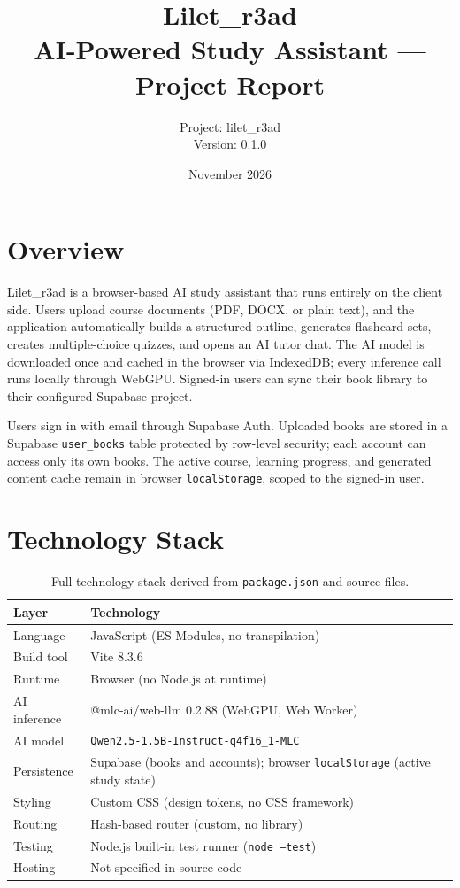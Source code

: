 \documentclass[12pt,a4paper]{article}
\title{\textbf{Lilet\_r3ad} \\ \large AI-Powered Study Assistant --- Project Report}
\author{Project: lilet\_r3ad \\ Version: 0.1.0}
\date{November 2026}
\begin{document}
\maketitle
\tableofcontents
\newpage

\section{Overview}

Lilet\_r3ad is a browser-based AI study assistant that runs entirely on the client
side. Users upload course documents (PDF, DOCX, or plain text), and the application
automatically builds a structured outline, generates flashcard sets, creates
multiple-choice quizzes, and opens an AI tutor chat. The AI model is downloaded
once and cached in the browser via IndexedDB; every inference call runs locally
through WebGPU. Signed-in users can sync their book library to their configured
Supabase project.

Users sign in with email through Supabase Auth. Uploaded books are stored in a
Supabase \texttt{user\_books} table protected by row-level security; each account
can access only its own books. The active course, learning progress, and generated
content cache remain in browser \texttt{localStorage}, scoped to the signed-in user.

\section{Technology Stack}

\begin{table}[h]
\centering
\begin{tabular}{@{}ll@{}}
\toprule
\textbf{Layer} & \textbf{Technology} \\
\midrule
Language          & JavaScript (ES Modules, no transpilation) \\
Build tool        & Vite 8.3.6 \\
Runtime           & Browser (no Node.js at runtime) \\
AI inference      & @mlc-ai/web-llm 0.2.88 (WebGPU, Web Worker) \\
AI model          & \texttt{Qwen2.5-1.5B-Instruct-q4f16\_1-MLC} \\
Persistence       & Supabase (books and accounts); browser \texttt{localStorage} (active study state) \\
Styling           & Custom CSS (design tokens, no CSS framework) \\
Routing           & Hash-based router (custom, no library) \\
Testing           & Node.js built-in test runner (\texttt{node --test}) \\
Hosting           & Not specified in source code \\
\bottomrule
\end{tabular}
\caption{Full technology stack derived from \texttt{package.json} and source files.}
\end{table}
\end{document}
